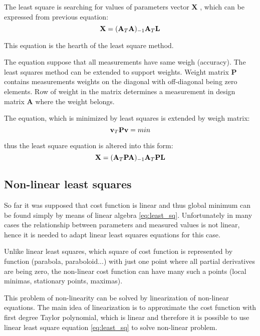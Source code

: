 \documentclass[a4paper,12pt]{report}
\newcommand{\ematr}[1]{
{\bf #1}
}
\newcommand{\evect}[1]{
{\bf #1}
}
\begin{document}
The least square is searching for values of parameters vector \evect{X}, which can be expressed from previous equation:
\begin{equation}
\evect{X} = (\ematr{A}_{T} \ematr{A})_{-1} \ematr{A}_{T} \ematr{L}
\end{equation}

This equation is the hearth of the least square method.

The equation suppose that all measurements have same weigh (accuracy). The least squares method can be extended to support weights.
Weight matrix \ematr{P} contains measurements weights on the diagonal with off-diagonal being zero elements.
Row of weight in the matrix determines a measurement in design matrix \ematr{A} where the weight belongs.

The equation, which is minimized by least squares is extended by weigh matrix:
\begin{equation}
\evect{v}_{T}  \ematr{P} \evect{v} = min
\end{equation}

thus the least square equation is altered into this form:
\begin{equation}
\evect{X} = (\ematr{A}_{T} \ematr{P} \ematr{A})_{-1} \ematr{A}_{T} \ematr{P} \ematr{L}
\label{eq:least_sq}
\end{equation}

\subsection{Non-linear least squares}
\label{sec:non_least}
So far it was supposed that cost function is linear and thus global minimum can be found simply by means of linear algebra  \eqref{eq:least_sq}.
Unfortunately in many cases the relationship between parameters and 
measured values is not linear, hence it is needed to adapt linear least squares equations for this case.

Unlike linear least squares, which square of cost function is represented by function  (parabola, paraboloid...) with just one point where all
partial derivatives are being zero, the non-linear cost function can have many such a points (local minimas, stationary points, maximas). 

This problem of non-linearity can be solved by linearization of non-linear equations.
The main idea of linearization is to approximate the cost function with first degree Taylor polynomial,
which is linear and therefore it is possible to use linear least square equation \eqref{eq:least_sq} 
to solve non-linear problem. 
\end{document}
